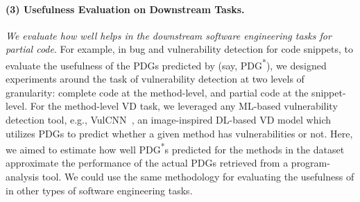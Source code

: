 \paragraph{\bf (3) Usefulness Evaluation on Downstream Tasks.}

{\em We evaluate how well {\tool} helps in the downstream software
  engineering tasks for partial code}. For example, in bug and
vulnerability detection for code snippets, to evaluate the usefulness
of the PDGs predicted by \tool (say, PDG\textsuperscript{*}), we
designed experiments around the task of vulnerability detection at two
levels of granularity: complete code at the method-level, and partial
code at the snippet-level. For the method-level VD task, we leveraged
any ML-based vulnerability detection tool, e.g.,
VulCNN~\cite{wu2022vulcnn}, an image-inspired DL-based VD model which
utilizes PDGs to predict whether a given method has vulnerabilities or
not. Here, we aimed to estimate how well PDG\textsuperscript{*}s
predicted for the methods in the dataset approximate the performance
of the actual PDGs retrieved from a program-analysis tool. We could
use the same methodology for evaluating the usefulness of {\tool} in
other types of software engineering tasks.




